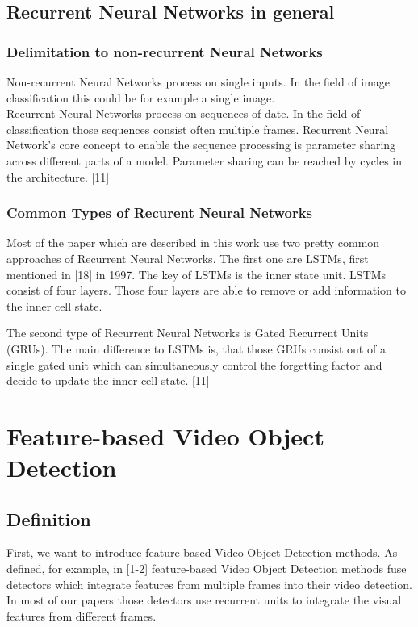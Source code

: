 \documentclass[conference]{IEEEtran}
\begin{document}
\subsection{Recurrent Neural Networks in general}
\subsubsection{Delimitation to non-recurrent Neural Networks} 
Non-recurrent Neural Networks process on single inputs. In the field of image classification this could be for example a single image. \\
Recurrent Neural Networks process on sequences of date. In the field of classification those sequences consist often multiple frames. Recurrent Neural Network's core concept to enable the sequence processing is parameter sharing across different parts of a model. Parameter sharing can be reached by cycles in the architecture. [11] \newline

\subsubsection{Common Types of Recurent Neural Networks}
Most of the paper which are described in this work use two pretty common approaches of Recurrent Neural Networks. The first one are LSTMs, first mentioned in [18] in 1997. The key of LSTMs is the inner state unit. LSTMs consist of four layers. Those four layers are able to remove or add information to the inner cell state.  \newline

The second type of Recurrent Neural Networks is Gated Recurrent Units (GRUs). The main difference to LSTMs is, that those GRUs consist out of a single gated unit which can simultaneously control the forgetting factor and decide to update the inner cell state. [11]

\section{Feature-based Video Object Detection}

\subsection{Definition}
First, we want to introduce feature-based Video Object Detection methods. As defined, for example, in [1-2] feature-based Video Object Detection methods fuse detectors which integrate features from multiple frames into their video detection. In most of our papers those detectors use recurrent units to integrate the visual features from different frames.  
\end{document}
